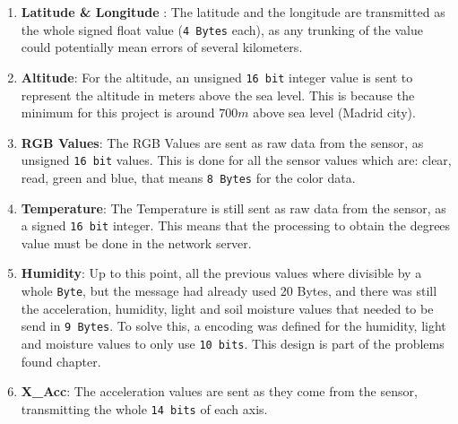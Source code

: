 \begin{enumerate}
    \item \textbf{Latitude \& Longitude }: The latitude and the longitude are transmitted as the whole signed float value (\texttt{4 Bytes} each), as any trunking of the value could potentially mean errors of several kilometers.
    \item \textbf{Altitude}: For the altitude, an unsigned \texttt{16 bit} integer value is sent to represent the altitude in meters above the sea level. This is because the minimum for this project is around $700m$ above sea level (Madrid city).
    \item \textbf{RGB Values}: The RGB Values are sent as raw data from the sensor, as unsigned \texttt{16 bit} values. This is done for all the sensor values which are: clear, read, green and blue, that means \texttt{8 Bytes} for the color data.
    \item \textbf{Temperature}: The Temperature is still sent as raw data from the sensor, as a signed \texttt{16 bit} integer. This means that the processing to obtain the degrees value must be done in the network server.
    \item \textbf{Humidity}: Up to this point, all the previous values where divisible by a whole \texttt{Byte}, but the message had already used 20 Bytes, and there was still the acceleration, humidity, light and soil moisture values that needed to be 
    send in \texttt{9 Bytes}. To solve this, a encoding was defined for the humidity, light and moisture values to only use \texttt{10 bits}. This design is part of the problems found chapter.
    \item \textbf{X\_Acc}: The acceleration values are sent as they come from the sensor, transmitting the whole \texttt{14 bits} of each axis.

\end{enumerate}
